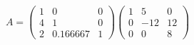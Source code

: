 \documentclass[pdf]{beamer}
\begin{document}
\begin{frame}{}$$A=\begin{pmatrix}1&0&0\\4&1&0\\2&0.166667&1\end{pmatrix} \begin{pmatrix}1&5&0\\0&-12&12\\0&0&8\end{pmatrix}$$
\end{frame}
\end{document}
